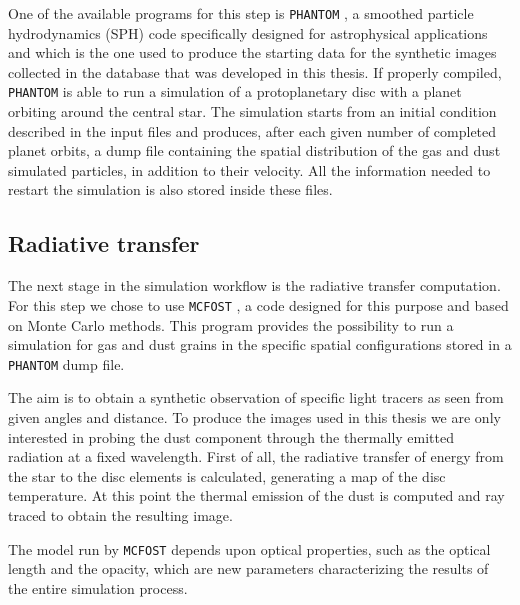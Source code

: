 \documentclass[a4paper,10pt]{report}
\begin{document}
One of the available programs for this step is \lstinline{PHANTOM} \citep{phantom}, a smoothed particle hydrodynamics (SPH) code 
specifically designed for astrophysical applications and which is the one used to produce
the starting data for the synthetic images collected in the database that was developed in this thesis.
If properly compiled, \lstinline{PHANTOM} is able to run a simulation of a protoplanetary disc with a planet orbiting around the central star. 
The simulation starts from an initial condition described in the input files and produces, after each given number of completed planet orbits, a dump file
containing the spatial distribution of the gas and dust simulated particles, in addition to their velocity. 
All the information needed to restart the simulation is also stored inside these files.

\subsection{Radiative transfer}

The next stage in the simulation workflow is the radiative transfer computation. For this
step we chose to use \lstinline{MCFOST} \citep{mcfost1,mcfost2}, a code designed for this purpose and based on Monte Carlo methods.
This program provides the possibility to run a simulation for gas and dust grains in the specific 
spatial configurations stored in a \lstinline{PHANTOM} dump file.

The aim is to obtain a synthetic observation of specific light tracers as seen from given angles and distance.
To produce the images used in this thesis we are only interested in probing the dust component through the thermally
emitted radiation at a fixed wavelength.
First of all, the radiative transfer of energy from the star to the disc elements is calculated, generating a map of the disc temperature.
At this point the thermal emission of the dust is computed and ray traced to obtain the resulting image.

The model run by \lstinline{MCFOST} depends upon optical properties, such as the optical length and the opacity, which 
are new parameters characterizing the results of the entire simulation process.
\end{document}
